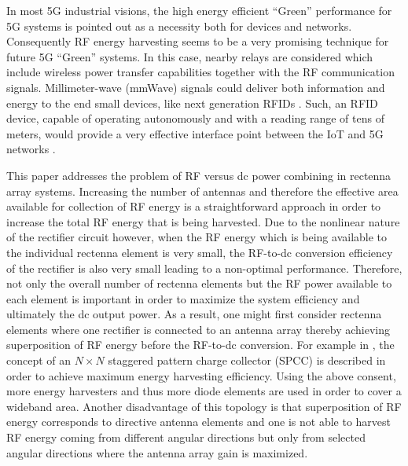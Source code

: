 \documentclass[journal]{IEEEtran}
\begin{document}
%
%
In most 5G industrial visions, the high energy efficient   ``Green'' performance for 5G systems is pointed out as a necessity both for devices and networks. 
%
Consequently RF energy harvesting seems to be a very promising technique for future 5G ``Green'' systems.
%
In this case, nearby relays are considered which  include wireless power transfer capabilities  together with the RF communication signals.
%
Millimeter-wave (mmWave) signals could deliver both information and energy to the end  small devices, like next generation RFIDs \cite{kimionis2017millimeter, tong2019achieving}. 
%
Such, an RFID device, capable of operating autonomously and with a reading range of  tens  of meters, would provide a very effective interface point between the IoT and 5G networks
\cite{hester2017mm}.


 




This paper addresses the problem of RF versus dc power combining in rectenna array systems.
%
Increasing the number of antennas and therefore the effective area available for collection of RF energy is a straightforward approach in order to increase the total RF energy that is being harvested. Due to the nonlinear nature of the rectifier circuit however, when the RF energy which is being available to the individual rectenna element is very small, the RF-to-dc conversion efficiency of the rectifier is also very small leading to a non-optimal performance. 
%
Therefore, not only the overall number of rectenna elements but the RF power available to each element is important in order to maximize the system  efficiency and ultimately the dc output power. 
%
As a result, one might first consider rectenna elements where one rectifier is connected to an antenna array thereby achieving superposition of RF energy before the RF-to-dc conversion. 
%
For example in \cite{marshall2013staggered},
the concept of an $N \times N$ staggered pattern charge collector (SPCC) is described  in order to achieve maximum energy harvesting efficiency. 
%
%
%
%
%
Using the above consent, more energy harvesters and thus more diode elements are used in order to cover a wideband area.
%
Another disadvantage of this topology is that superposition of RF energy corresponds to directive antenna elements and one is not able to harvest RF energy coming from different angular directions but only from selected angular directions where the antenna array gain is maximized. 
\end{document}
